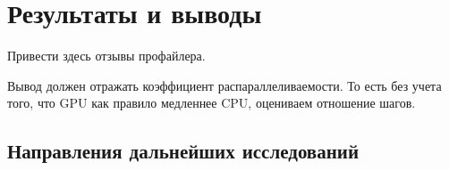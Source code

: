 \documentclass[a4paper,14pt,russian]{extreport}
\begin{document}
\chapter{Результаты и выводы}

Привести здесь отзывы профайлера.
\par Вывод должен отражать коэффициент распараллеливаемости. То есть без учета того, что GPU как правило медленнее CPU, оцениваем отношение шагов. 


\section{Направления дальнейших исследований}



 
\end{document}
